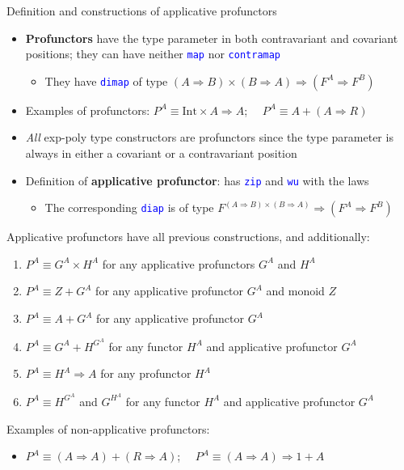 \documentclass[english]{beamer}
\begin{document}
\begin{frame}{Definition and constructions of applicative profunctors}
\begin{itemize}
\item \vspace{-0.2cm}\textbf{Profunctors} have the type parameter in both
contravariant and covariant positions; they can have neither \texttt{\textcolor{blue}{\footnotesize{}map}}
nor \texttt{\textcolor{blue}{\footnotesize{}contramap}} 
\begin{itemize}
\item They have \texttt{\textcolor{blue}{\footnotesize{}dimap}} of type
$\left(A\Rightarrow B\right)\times\left(B\Rightarrow A\right)\Rightarrow(F^{A}\Rightarrow F^{B})$ 
\end{itemize}
\item Examples of profunctors: $P^{A}\equiv\text{Int}\times A\Rightarrow A$;
$\quad P^{A}\equiv A+\left(A\Rightarrow R\right)$
\item \emph{All} exp-poly type constructors are profunctors since the type
parameter is always in either a covariant or a contravariant position
\item Definition of \textbf{applicative profunctor}: has \texttt{\textcolor{blue}{\footnotesize{}zip}}
and \texttt{\textcolor{blue}{\footnotesize{}wu}} with the laws
\begin{itemize}
\item The corresponding \texttt{\textcolor{blue}{\footnotesize{}diap}} is
of type $F^{\left(A\Rightarrow B\right)\times\left(B\Rightarrow A\right)}\Rightarrow(F^{A}\Rightarrow F^{B})$ 
\end{itemize}
\end{itemize}
Applicative profunctors have all previous constructions, and additionally:
\begin{enumerate}
\item $P^{A}\equiv G^{A}\times H^{A}$ for any applicative profunctors $G^{A}$
and $H^{A}$
\item $P^{A}\equiv Z+G^{A}$ for any applicative profunctor $G^{A}$ and
monoid $Z$
\item $P^{A}\equiv A+G^{A}$ for any applicative profunctor $G^{A}$
\item $P^{A}\equiv G^{A}+H^{G^{A}}$ for any functor $H^{A}$ and applicative
profunctor $G^{A}$
\item $P^{A}\equiv H^{A}\Rightarrow A$ for any profunctor $H^{A}$
\item $P^{A}\equiv H^{G^{A}}$ and $G^{H^{A}}$ for any functor $H^{A}$
and applicative profunctor $G^{A}$
\end{enumerate}
Examples of non-applicative profunctors:
\begin{itemize}
\item $P^{A}\equiv\left(A\Rightarrow A\right)+\left(R\Rightarrow A\right)$;
$\quad P^{A}\equiv\left(A\Rightarrow A\right)\Rightarrow1+A$
\end{itemize}
\end{frame}
\end{document}
